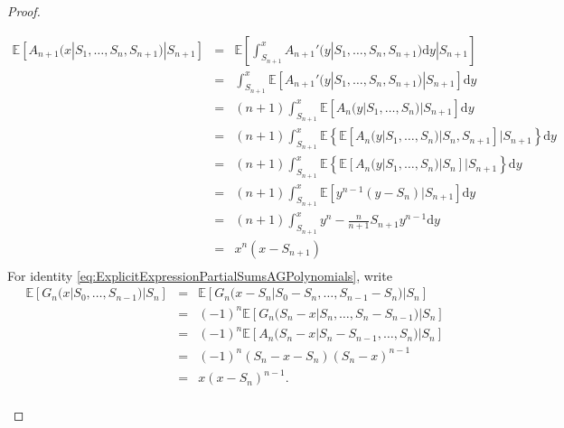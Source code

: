 \begin{proof}
\begin{enumerate}
\begin{eqnarray*}
\mathbb{E}\left[A_{n+1}(x|S_1,\ldots, S_n,S_{n+1})|S_{n+1}\right]&=&\mathbb{E}\left[\int_{S_{n+1}}^x A_{n+1}'(y|S_1,\ldots, S_n,S_{n+1})\text{d}y|S_{n+1}\right]\\
&=&\int_{S_{n+1}}^x\mathbb{E}\left[ A_{n+1}'(y|S_1,\ldots, S_n,S_{n+1})|S_{n+1}\right]\text{d}y\\
&=&(n+1)\int_{S_{n+1}}^x\mathbb{E}\left[A_{n}(y|S_1,\ldots, S_n)|S_{n+1}\right]\text{d}y\\
&=&(n+1)\int_{S_{n+1}}^x\mathbb{E}\left\{\mathbb{E}\left[A_{n}(y|S_1,\ldots, S_n)|S_n,S_{n+1}\right]|S_{n+1}\right\}\text{d}y\\
&=&(n+1)\int_{S_{n+1}}^x\mathbb{E}\left\{\mathbb{E}\left[A_{n}(y|S_1,\ldots, S_n)|S_n\right]|S_{n+1}\right\}\text{d}y\\
&=&(n+1)\int_{S_{n+1}}^x\mathbb{E}\left[y^{n-1}(y-S_n)|S_{n+1}\right]\text{d}y\\
&=&(n+1)\int_{S_{n+1}}^xy^n-\frac{n}{n+1}S_{n+1}y^{n-1} \text{d}y\\
&=&x^n(x-S_{n+1})\\
\end{eqnarray*}
For identity \eqref{eq:ExplicitExpressionPartialSumsAGPolynomials}, write 
\begin{eqnarray*}
\mathbb{E}\left[G_{n}(x|S_0,\ldots, S_{n-1})|S_{n}\right]&=&\mathbb{E}\left[G_{n}(x-S_n|S_0 - S_n,\ldots, S_{n-1}-S_n)|S_{n}\right]\\
&=&(-1)^n\mathbb{E}\left[G_{n}(S_n-x|S_n,\ldots, S_{n}-S_{n-1})|S_{n}\right]\\
&=&(-1)^n\mathbb{E}\left[A_{n}(S_n-x|S_{n}-S_{n-1},\ldots, S_n)|S_{n}\right]\\
&=&(-1)^n(S_n-x -S_n)(S_n-x)^{n-1}\\
&=&x(x-S_n)^{n-1}.\\
\end{eqnarray*}
\end{enumerate}
\end{proof}

